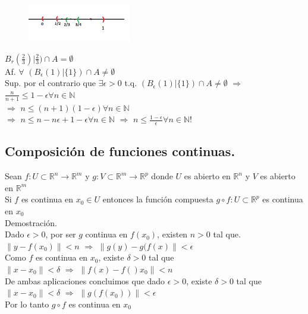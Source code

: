 \documentclass[secnumarabic,balancelastpage,amsmath,amssymb]{article}
\providecommand{\norm}[1]{\lVert#1\rVert}
\theoremstyle{remark}
\theoremstyle{definition}
\theoremstyle{prop}
\begin{document}
\begin{figure}[h!]
\centering
\includegraphics[width=0.4\textwidth]{9.PNG}
\label{fig:fig5.}
\end{figure}

$B_{r}(\frac{2}{3})|\frac{2}{3}) \cap A = \emptyset$\\

Af. $\forall$ $(B_{\epsilon}(1)| \{1\}) \cap A \not= \emptyset$\\
Sup. por el contrario que $\exists \epsilon>0$ t.q. $(B_{\epsilon}(1)| \{1\}) \cap A \not= \emptyset$ $\Rightarrow$ $\frac{n}{n+1} \leq 1-\epsilon  \forall n \in \mathbb{N}$\\
$\Rightarrow$ $n \leq (n+1)(1-\epsilon) \forall n \in \mathbb{N}$\\
$\Rightarrow$ $n \leq n-n \epsilon+1-\epsilon \forall n \in \mathbb{N}$ $\Rightarrow$ $n \leq \frac{1-\epsilon}{\epsilon} \forall n \in \mathbb{N} !$ \\

\subsection*{Composición de funciones continuas.}
Sean $f:U \subset \mathbb{R}^{n} \rightarrow \mathbb{R}^{m}$ y $g:V \subset \mathbb{R}^{m} \rightarrow \mathbb{R}^{p}$ donde $U$ es abierto en $\mathbb{R}^{n}$ y $V$ es abierto en $\mathbb{R}^{m}$\\
Si $f$ es continua en $x_{0}\in U$ entonces la función compuesta $g \circ f: U \subset \mathbb{R}^{p}$ es continua en $x_{0}$\\
Demostración. \\
Dado $\epsilon > 0$, por ser $g$ continua en $f(x_{0})$, existen $n>0$ tal que. $\norm{y-f(x_{0})} <n$ $\Rightarrow$ $\norm{g(y)-g(f(x)} < \epsilon$\\
Como $f$ es continua en $x_{0}$, existe $\delta > 0$ tal que\\
$\norm{x-x_{0}} < \delta$ $\Rightarrow$ $\norm{f(x)-f()x_{0}} < n$\\
De ambas aplicaciones concluimos que dado $\epsilon > 0$, existe $\delta> 0$ tal que\\
$\norm{x-x_{0}} < \delta$ $\Rightarrow$ $\norm{g(f(x_{0}))} < \epsilon$\\
Por lo tanto $g \circ f$ es continua en $x_{0}$
\end{document}
